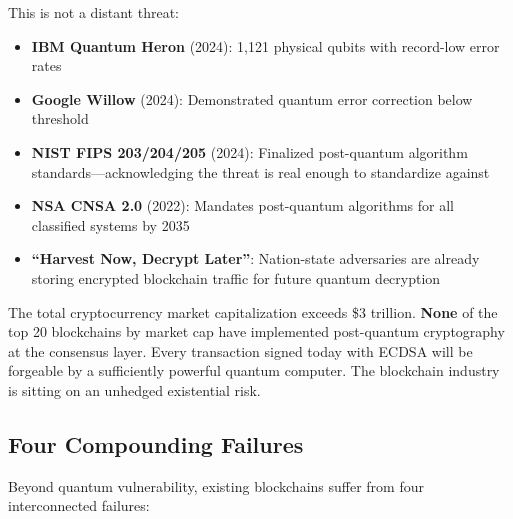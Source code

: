 \documentclass[11pt,a4paper]{article}
\begin{document}
This is not a distant threat:
\begin{itemize}[leftmargin=1.5em]
    \item \textbf{IBM Quantum Heron} (2024): 1,121 physical qubits with record-low error rates
    \item \textbf{Google Willow} (2024): Demonstrated quantum error correction below threshold
    \item \textbf{NIST FIPS 203/204/205} (2024): Finalized post-quantum algorithm standards---acknowledging the threat is real enough to standardize against
    \item \textbf{NSA CNSA 2.0} (2022): Mandates post-quantum algorithms for all classified systems by 2035
    \item \textbf{``Harvest Now, Decrypt Later''}: Nation-state adversaries are already storing encrypted blockchain traffic for future quantum decryption
\end{itemize}

\begin{warningbox}
The total cryptocurrency market capitalization exceeds \$3 trillion. \textbf{None} of the top 20 blockchains by market cap have implemented post-quantum cryptography at the consensus layer. Every transaction signed today with ECDSA will be forgeable by a sufficiently powerful quantum computer. The blockchain industry is sitting on an unhedged existential risk.
\end{warningbox}

\subsection{Four Compounding Failures}

Beyond quantum vulnerability, existing blockchains suffer from four interconnected failures:
\end{document}
